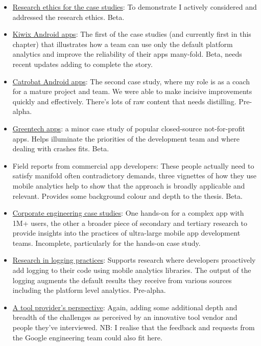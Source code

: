 \begin{itemize}
\begin{itemize}
        \item \href{section-research-ethics-for-the-case-studies}{Research ethics for the case studies}: To demonstrate I actively considered and addressed the research ethics. Beta.
        \item \href{section-kiwix-case-study}{Kiwix Android apps}: The first of the case studies (and currently first in this chapter) that illustrates how a team can use only the default platform analytics and improve the reliability of their apps many-fold. Beta, needs recent updates adding to complete the story.
        \item \href{section-catrobat-case-study}{Catrobat Android apps}: The second case study, where my role is as a coach for a mature project and team. We were able to make incisive improvements quickly and effectively. There's lots of raw content that needs distilling. Pre-alpha.
        \item \href{study-greentech-apps}{Greentech apps}: a minor case study of popular closed-source not-for-profit apps. Helps illuminate the priorities of the development team and where dealing with crashes fits. Beta.
        \item Field reports from commercial app developers: These people actually need to satisfy manifold often contradictory demands, three vignettes of how they use mobile analytics help to show that the approach is broadly applicable and relevant. Provides some background colour and depth to the thesis. Beta.
        \item \href{section-corporate-engineering-case-studies}{Corporate engineering case studies}: One hands-on for a complex app with 1M+ users, the other a broader piece of secondary and tertiary research to provide insights into the practices of ultra-large mobile app development teams. Incomplete, particularly for the hands-on case study. 
        \item \href{section-research-in-logging-practices}{Research in logging practices}: Supports research where developers proactively add logging to their code using mobile analytics libraries. The output of the logging augments the default results they receive from various sources including the platform level analytics. Pre-alpha. 
        \item \href{section-tool-providers-perspective}{A tool provider's perspective}: Again, adding some additional depth and breadth of the challenges as perceived by an innovative tool vendor and people they've interviewed. NB: I realise that the feedback and requests from the Google engineering team could also fit here.

\end{itemize}
\end{itemize}
